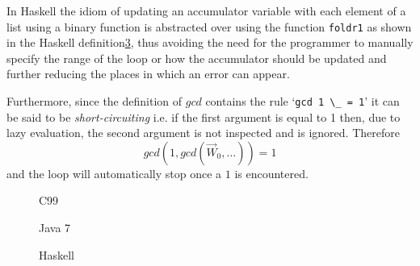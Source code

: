 In Haskell the idiom of updating an accumulator variable with each element of a list using a binary function is abstracted over using the function \lstinline|foldr1| as shown in the Haskell definition\ref{fig:gcds:haskell}, thus avoiding the need for the programmer to manually specify the range of the loop or how the accumulator should be updated and further reducing the places in which an error can appear.

Furthermore, since the definition of $gcd$ contains the rule `\lstinline|gcd 1 \_ = 1|' it can be said to be \emph{short-circuiting} i.e. if the first argument is equal to 1 then, due to lazy evaluation, the second argument is not inspected and is ignored. Therefore $$gcd (1, gcd (\vec{W}_0,\ldots )) = 1$$ and the loop will automatically stop once a $1$ is encountered.

\begin{figure}

\caption{C99}
\label{fig:gcds:c}
\end{figure}
\begin{figure}

\caption{Java 7}
\label{fig:gcds:java}
\end{figure}
\begin{figure}

\caption{Haskell}
\label{fig:gcds:haskell}
\end{figure}





